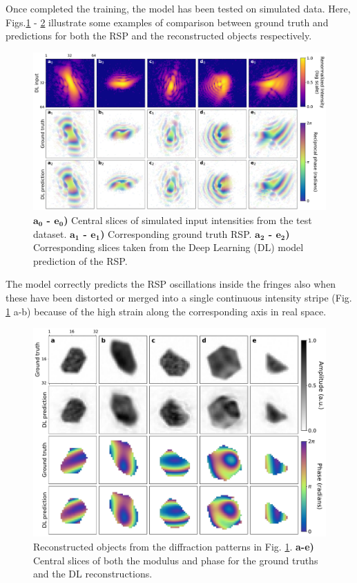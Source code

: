 Once completed the training, the model has been tested on simulated data. Here, Figs.\ref{fig:RSP_paper_sim} - \ref{fig:obj_paper_sim}
illustrate some examples of comparison between ground truth and predictions for both the RSP and the reconstructed objects 
respectively. 

\begin{figure}[H]
    \centering
    \includegraphics[width=\textwidth]{figures/Phasing/RSP_3Dsim.pdf}
    \caption{\textbf{\(\boldsymbol{a_0}\) - \(\boldsymbol{e_0}\))} Central slices of simulated input intensities from 
     the test dataset. \textbf{\(\boldsymbol{a_1}\) - \(\boldsymbol{e_1}\))} Corresponding ground truth RSP. 
     \textbf{\(\boldsymbol{a_2}\) - \(\boldsymbol{e_2}\))} Corresponding slices taken from the Deep Learning (DL)
     model prediction of the RSP.}
    \label{fig:RSP_paper_sim}
\end{figure}

The model correctly predicts the RSP oscillations inside the fringes also when these have been distorted or merged into
a single continuous intensity stripe (Fig. \ref{fig:RSP_paper_sim} a-b) because of the high strain along the corresponding 
axis in real space.

\begin{figure}[H]
    \centering
    \includegraphics[width=\textwidth]{figures/Phasing/obj_3Dsim.pdf}
    \caption{Reconstructed objects from the diffraction patterns in Fig. \ref{fig:RSP_paper_sim}.  
    \textbf{a-e)} Central slices of both the modulus and phase for the ground truths and the DL reconstructions.}
    \label{fig:obj_paper_sim}
\end{figure}

